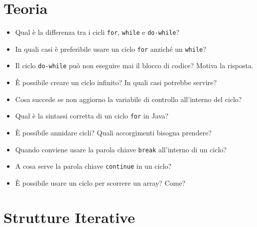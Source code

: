 \documentclass{article}
\begin{document}
\section{Teoria}

\begin{itemize}
    \item Qual è la differenza tra i cicli \texttt{for}, \texttt{while} e \texttt{do-while}?
    \item In quali casi è preferibile usare un ciclo \texttt{for} anziché un \texttt{while}?
    \item Il ciclo \texttt{do-while} può non eseguire mai il blocco di codice? Motiva la risposta.
    \item È possibile creare un ciclo infinito? In quali casi potrebbe servire?
    \item Cosa succede se non aggiorno la variabile di controllo all'interno del ciclo?
    \item Qual è la sintassi corretta di un ciclo \texttt{for} in Java?
    \item È possibile annidare cicli? Quali accorgimenti bisogna prendere?
    \item Quando conviene usare la parola chiave \texttt{break} all'interno di un ciclo?
    \item A cosa serve la parola chiave \texttt{continue} in un ciclo?
    \item È possibile usare un ciclo per scorrere un array? Come?
\end{itemize}

\section{Strutture Iterative}
\end{document}
